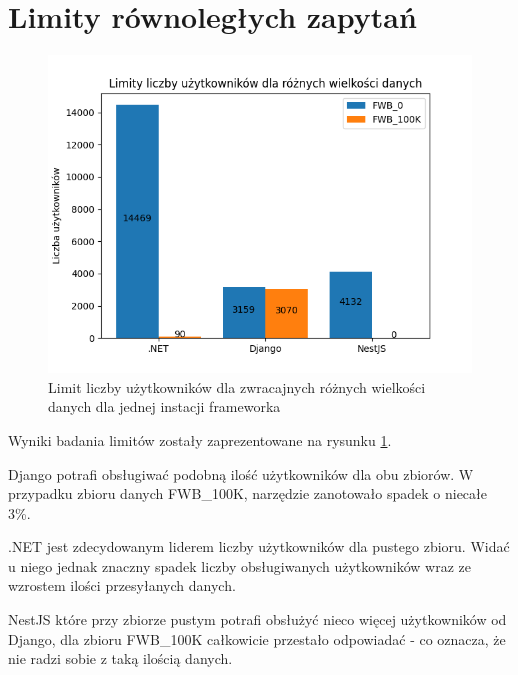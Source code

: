 \section{Limity równoległych zapytań}

\begin{figure}[!hb]
	\centering \includegraphics[width=1\linewidth]{rysunki/Limit_vus_for_different_datasets.png}
	\caption{Limit liczby użytkowników dla zwracajnych różnych wielkości danych dla jednej instacji frameworka}
	\label{rys:limit_vus}
\end{figure}

Wyniki badania limitów zostały zaprezentowane na rysunku \ref{rys:limit_vus}.

Django potrafi obsługiwać podobną ilość użytkowników dla obu zbiorów.
W przypadku zbioru danych FWB\_100K, narzędzie zanotowało spadek o niecałe 3\%.

.NET jest zdecydowanym liderem liczby użytkowników dla pustego zbioru. 
Widać u niego jednak znaczny spadek liczby obsługiwanych użytkowników wraz ze wzrostem ilości przesyłanych danych.

NestJS które przy zbiorze pustym potrafi obsłużyć nieco więcej użytkowników od Django, dla zbioru FWB\_100K całkowicie przestało odpowiadać - co oznacza, że nie radzi sobie z taką ilością danych.

